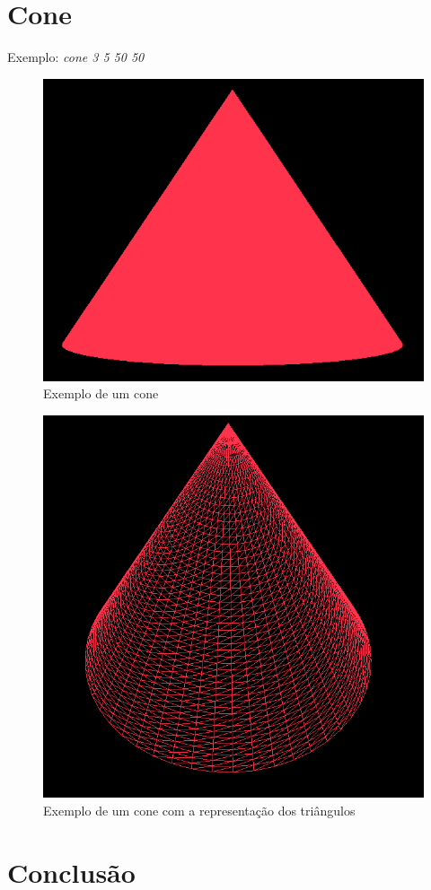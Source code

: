 \documentclass{article}
\begin{document}
\section{Cone}
Exemplo: \textit{cone 3 5 50 50}
\begin{figure}[H]
\centering\includegraphics[scale=0.45]{cone2} 
\caption{\label{fig:controller}Exemplo de um cone}
\end{figure} \begin{figure}[H]
\centering\includegraphics[scale=0.4]{cone1} 
\caption{\label{fig:controller}Exemplo de um cone com a representação dos triângulos}
\end{figure}
\newpage
\section{Conclusão}
\end{document}
